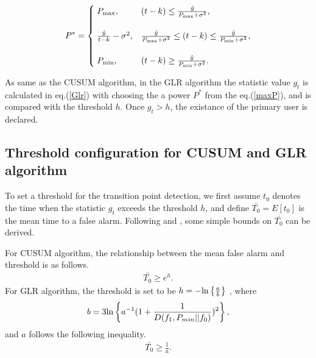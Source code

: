 \begin{align}
P^{*}=
\begin{cases}
\;P_{{\rm max}}, & (t-k)\leq\frac{\hat{y}}{P_{{\rm max}}+\sigma^2}, \\
\; \\ 
\;\frac{\hat{y}}{t-k}-\sigma^2, & \frac{\hat{y}}{P_{{\rm max}}+\sigma^2}\leq(t-k)\leq\frac{\hat{y}}{P_{{\rm min}}+\sigma^2}, \label{maxP} \\ 
\; \\
\; P_{{\rm min}}, & (t-k) \geq \frac{\hat{y}}{P_{{\rm min}}+\sigma^2}.
\end{cases}
\end{align}

As same as the CUSUM algorithm, in the GLR algorithm the statistic value $g_t$ is calculated in eq.(\ref{Glr}) with choosing the a power $P^{*}$ from the eq.(\ref{maxP}), and is compared with the threshold $h$. Once $g_t>h$, the existance of the primary user is declared.

\subsection{Threshold configuration for CUSUM and GLR algorithm}
To set a threshold for the transition point detection, we first assume $t_0$ denotes the time when the statistic $g_t$ exceeds the threshold $h$, and define $\bar{T_0}=E[t_0]$ is the mean time to a false alarm. Following \cite{ref:threshold_cusum} and \cite{ref:threshold_GLR}, some simple bounds on $\bar{T_0}$ can be derived.

For CUSUM algorithm, the relationship between the mean false alarm and threshold is as follows.
\begin{eqnarray}
\bar{T_0} \geq e^h.
\end{eqnarray}
For GLR algorithm, the threshold is set to be $h=-{\rm ln}\left\{\frac{a}{b}\right\}$ , where 
\begin{eqnarray}
b=3{\rm ln}\left\{a^{-1}(1+\frac{1}{D(f_1,P_{min}||f_0)})^2\right\},
\end{eqnarray}
and $a$ follows the following inequality.
\begin{eqnarray}
\bar{T_0} \geq \frac{1}{a}.
\end{eqnarray}
